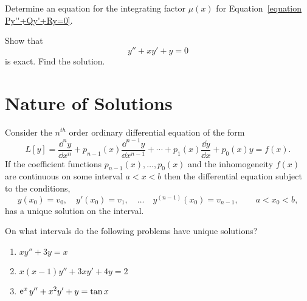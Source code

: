 \begin{Exercise}
  \label{exercise second order integrating factor}
  Determine an equation for the integrating factor $\mu(x)$ for 
  Equation~\ref{equation Py''+Qy'+Ry=0}.

\end{Exercise}




\begin{Exercise}
  \label{exercise yxyy=0}
  Show that
  \[
  y'' + x y' + y = 0
  \]
  is exact.  Find the solution.

\end{Exercise}









\section{Nature of Solutions}





\begin{Result}
  Consider the $n^{t h}$ order ordinary differential equation of the form
  \begin{equation}
    \label{Ly=yn+pn-1yn-1++p0y=f}
    L[y] = \frac{\dd^n y}{\dd x^n} + p_{n-1}(x) \frac{\dd^{n-1} y}{\dd x^{n-1}} + \cdots
    + p_1(x) \frac{\dd y}{\dd x} + p_0(x) y = f(x). 
  \end{equation}
  If the coefficient functions $p_{n-1}(x), \ldots, p_0(x)$ and the 
  inhomogeneity $f(x)$ are continuous on some interval $a <x < b$ then
  the differential equation subject to the conditions,
  \[ 
  y(x_0) = v_0, \quad y'(x_0) = v_1, \quad \ldots \quad 
  y^{(n-1)}(x_0) = v_{n-1}, \qquad a < x_0 < b,
  \]
  has a unique solution on the interval.
\end{Result}




\begin{Exercise}
  \label{exercise xy3y=x}
  On what intervals do the following problems have unique solutions?
  \begin{enumerate}
  \item
    $ \displaystyle
    x y'' + 3 y = x
    $
  \item
    $ \displaystyle
    x (x-1) y'' + 3 x y' + 4 y = 2
    $
  \item
    $ \displaystyle
    \mathop{\mathrm{e}}\nolimits^x y'' + x^2 y' + y = \tan x
    $
  \end{enumerate}

\end{Exercise}








